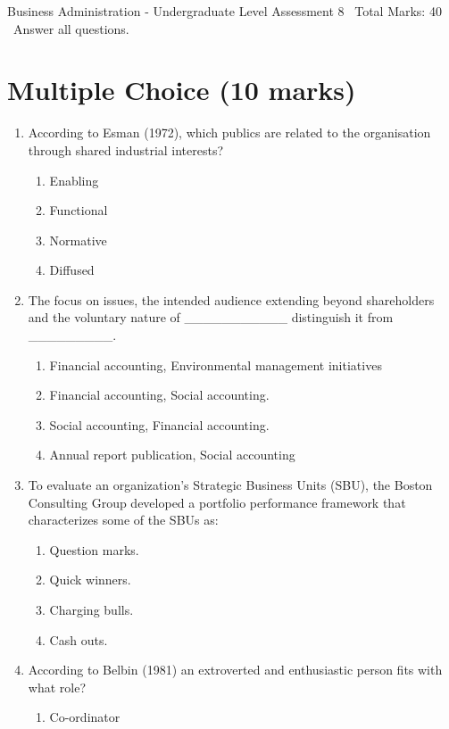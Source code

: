 \documentclass[12pt]{article}
\begin{document}
\begin{center}
Business Administration - Undergraduate Level Assessment 8 \
Total Marks: 40 \
Answer all questions.
\end{center}

\section*{Multiple Choice (10 marks)}
\begin{enumerate}[label=\arabic*.]
\item According to Esman (1972), which publics are related to the organisation through shared industrial interests?
\begin{enumerate}[label=(\alph*)]
    \item Enabling
    \item Functional
    \item Normative
    \item Diffused
\end{enumerate}
\item The focus on issues, the intended audience extending beyond shareholders and the voluntary nature of \_\_\_\_\_\_\_\_\_\_\_ distinguish it from \_\_\_\_\_\_\_\_\_.
\begin{enumerate}[label=(\alph*)]
    \item Financial accounting, Environmental management initiatives
    \item Financial accounting, Social accounting.
    \item Social accounting, Financial accounting.
    \item Annual report publication, Social accounting
\end{enumerate}
\item To evaluate an organization's Strategic Business Units (SBU), the Boston Consulting Group developed a portfolio performance framework that characterizes some of the SBUs as:
\begin{enumerate}[label=(\alph*)]
    \item Question marks.
    \item Quick winners.
    \item Charging bulls.
    \item Cash outs.
\end{enumerate}
\item According to Belbin (1981) an extroverted and enthusiastic person fits with what role?
\begin{enumerate}[label=(\alph*)]
    \item Co-ordinator

\end{enumerate}
\end{enumerate}
\end{document}
